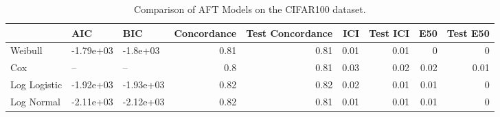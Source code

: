 \begin{table*}
\centering
\caption{Comparison of AFT Models on the CIFAR100 dataset.}
\label{tab:cifar100}
\begin{tabular}{lllrrrrrr}
\toprule
 & AIC & BIC & Concordance & Test Concordance & ICI & Test ICI & E50 & Test E50 \\
\midrule
Weibull & -1.79e+03 & -1.8e+03 & 0.81 & 0.81 & 0.01 & 0.01 & 0 & 0 \\
Cox & -- & -- & 0.8 & 0.81 & 0.03 & 0.02 & 0.02 & 0.01 \\
Log Logistic & -1.92e+03 & -1.93e+03 & 0.82 & 0.82 & 0.02 & 0.01 & 0.01 & 0 \\
Log Normal & -2.11e+03 & -2.12e+03 & 0.82 & 0.81 & 0.01 & 0.01 & 0.01 & 0 \\
\bottomrule
\end{tabular}
\end{table*}
